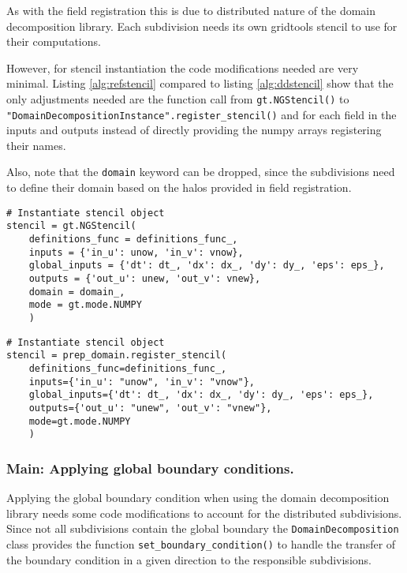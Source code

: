 As with the field registration this is due to distributed nature of the domain decomposition library.
Each subdivision needs its own gridtools stencil to use for their computations.

However, for stencil instantiation the code modifications needed are very minimal.
Listing \ref{alg:refstencil} compared to listing \ref{alg:ddstencil} show that the only adjustments needed are the function call from \texttt{gt.NGStencil()} to \texttt{"DomainDecompositionInstance".register\_stencil()} and for each field in the inputs and outputs instead of directly providing the numpy arrays registering their names.

Also, note that the \texttt{domain} keyword can be dropped, since the subdivisions need to define their domain based on the halos provided in field registration.

\begin{lstlisting}[caption={Example code for the original user stencil instantiation.},captionpos=b, label={alg:refstencil}]
# Instantiate stencil object
stencil = gt.NGStencil(
    definitions_func = definitions_func_,
    inputs = {'in_u': unow, 'in_v': vnow},
    global_inputs = {'dt': dt_, 'dx': dx_, 'dy': dy_, 'eps': eps_},
    outputs = {'out_u': unew, 'out_v': vnew},
    domain = domain_,
    mode = gt.mode.NUMPY
    )
\end{lstlisting}

\begin{lstlisting}[caption={Example code for the same stencil instantiation using the domain decomposition library.},captionpos=b, label={alg:ddstencil}]
# Instantiate stencil object
stencil = prep_domain.register_stencil(
    definitions_func=definitions_func_,
    inputs={'in_u': "unow", 'in_v': "vnow"},
    global_inputs={'dt': dt_, 'dx': dx_, 'dy': dy_, 'eps': eps_},
    outputs={'out_u': "unew", 'out_v': "vnew"},
    mode=gt.mode.NUMPY
    )
\end{lstlisting}

\subsubsection{Main: Applying global boundary conditions.}
Applying the global boundary condition when using the domain decomposition library needs some code modifications to account for the distributed subdivisions.
Since not all subdivisions contain the global boundary the \texttt{DomainDecomposition} class provides the function \texttt{set\_boundary\_condition()} to handle the transfer of the boundary condition in a given direction to the responsible subdivisions.

